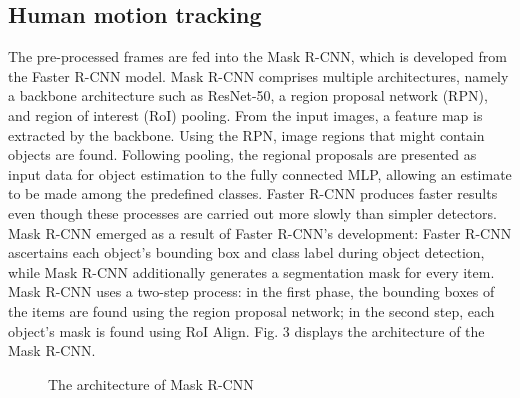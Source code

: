\documentclass[conference]{IEEEtran}
\begin{document}
\subsection{Human motion tracking}
The pre-processed frames are fed into the Mask R-CNN, which is developed from the Faster R-CNN model. Mask R-CNN comprises multiple architectures, namely a backbone architecture such as ResNet-50, a region proposal network (RPN), and region of interest (RoI) pooling. From the input images, a feature map is extracted by the backbone. Using the RPN, image regions that might contain objects are found. Following pooling, the regional proposals are presented as input data for object estimation to the fully connected MLP, allowing an estimate to be made among the predefined classes. Faster R-CNN produces faster results even though these processes are carried out more slowly than simpler detectors. Mask R-CNN emerged as a result of Faster R-CNN's development: Faster R-CNN ascertains each object's bounding box and class label during object detection, while Mask R-CNN additionally generates a segmentation mask for every item. Mask R-CNN uses a two-step process: in the first phase, the bounding boxes of the items are found using the region proposal network; in the second step, each object's mask is found using RoI Align. Fig. 3 displays the architecture of the Mask R-CNN.

\begin{figure}[htbp]
\centering
{}
\caption{The architecture of Mask R-CNN}
\label{fig3}
\end{figure}
\end{document}

